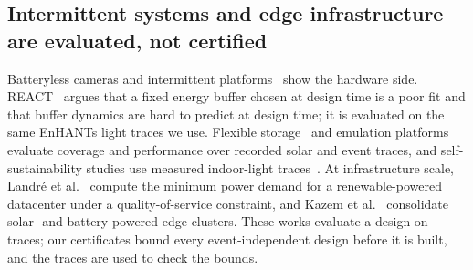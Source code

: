 \subsection{Intermittent systems and edge infrastructure are evaluated, not certified}
Batteryless cameras and intermittent platforms~\cite{desai2022camaroptera,hester2017mayfly,lee2026nowornever} show the hardware side. REACT~\cite{williams2024react} argues that a fixed energy buffer chosen at design time is a poor fit and that buffer dynamics are hard to predict at design time; it is evaluated on the same EnHANTs light traces we use. Flexible storage~\cite{alsubhi2024stash} and emulation platforms~\cite{liedtke2026estacker} evaluate coverage and performance over recorded solar and event traces, and self-sustainability studies use measured indoor-light traces~\cite{mayer2024iotj,kim2024iotj}. At infrastructure scale, Landr\'e et al.~\cite{landre2025fgcs} compute the minimum power demand for a renewable-powered datacenter under a quality-of-service constraint, and Kazem et al.~\cite{kazem2026fgcs} consolidate solar- and battery-powered edge clusters. These works evaluate a design on traces; our certificates bound every event-independent design before it is built, and the traces are used to check the bounds.

